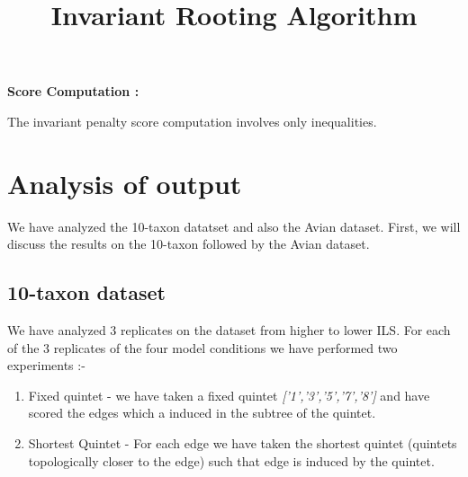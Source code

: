 \documentclass[letterpaper, 12pt]{article}
\title{ Invariant  Rooting  Algorithm }
\begin{document}
\maketitle

{\bf Score Computation : } 

The invariant penalty score computation involves only inequalities.

\section{Analysis of output}

 We have analyzed the 10-taxon datatset and also the Avian dataset. First, we will discuss the results on the 10-taxon followed by the Avian dataset.
 
 \subsection{10-taxon dataset}
 
 We have analyzed 3 replicates on the  dataset from higher to lower ILS. For each of the 3 replicates of the four model conditions we have performed two experiments :-
 
 \begin{enumerate}
 \item Fixed quintet - we have taken a fixed quintet {\em ['1','3','5','7','8'] } and have scored the edges which a induced in the subtree of the quintet. 
 \item Shortest Quintet - For each edge we have taken the shortest quintet (quintets topologically closer to the edge) such that edge is induced by the quintet.
 \end{enumerate}
 
\end{document}
